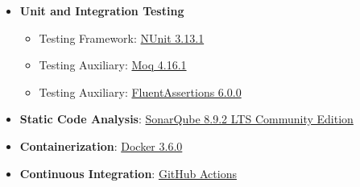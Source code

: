 \begin{itemize}
\begin{itemize}
    \end{itemize}
    \item \textbf{Unit and Integration Testing}
    \begin{itemize}
        \item Testing Framework: \href{https://www.nuget.org/packages/NUnit/}{NUnit 3.13.1}
        \item Testing Auxiliary: \href{https://www.nuget.org/packages/Moq/}{Moq 4.16.1}
        \item Testing Auxiliary: \href{https://www.nuget.org/packages/FluentAssertions}{FluentAssertions 6.0.0}
    \end{itemize}
    \item \textbf{Static Code Analysis}: \href{https://www.sonarqube.org/downloads/}{SonarQube 8.9.2 LTS Community Edition}
    \item \textbf{Containerization}: \href{https://docs.docker.com/desktop/windows/install/}{Docker 3.6.0}
    \item \textbf{Continuous Integration}: \href{https://docs.github.com/en/actions}{GitHub Actions}
\end{itemize}